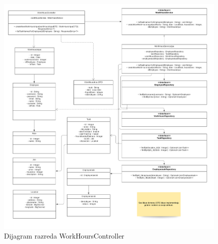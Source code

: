 			
			\eject
			
			
			
			
			\begin{figure}[H]
					\centering
					\includegraphics[width=\textwidth]{slike/fixWorkHoursController.jpg}
					\caption{Dijagram razreda WorkHoursController}
				\end{figure}
			
